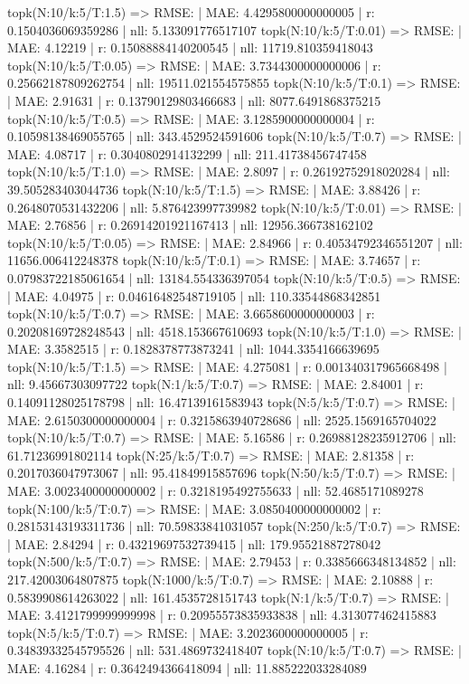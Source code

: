 topk(N:10/k:5/T:1.5) => RMSE: | MAE: 4.4295800000000005 | r: 0.1504036069359286 | nll: 5.133091776517107
topk(N:10/k:5/T:0.01) => RMSE: | MAE: 4.12219 | r: 0.15088884140200545 | nll: 11719.810359418043
topk(N:10/k:5/T:0.05) => RMSE: | MAE: 3.7344300000000006 | r: 0.25662187809262754 | nll: 19511.021554575855
topk(N:10/k:5/T:0.1) => RMSE: | MAE: 2.91631 | r: 0.13790129803466683 | nll: 8077.6491868375215
topk(N:10/k:5/T:0.5) => RMSE: | MAE: 3.1285900000000004 | r: 0.10598138469055765 | nll: 343.4529524591606
topk(N:10/k:5/T:0.7) => RMSE: | MAE: 4.08717 | r: 0.3040802914132299 | nll: 211.41738456747458
topk(N:10/k:5/T:1.0) => RMSE: | MAE: 2.8097 | r: 0.26192752918020284 | nll: 39.505283403044736
topk(N:10/k:5/T:1.5) => RMSE: | MAE: 3.88426 | r: 0.2648070531432206 | nll: 5.876423997739982
topk(N:10/k:5/T:0.01) => RMSE: | MAE: 2.76856 | r: 0.26914201921167413 | nll: 12956.366738162102
topk(N:10/k:5/T:0.05) => RMSE: | MAE: 2.84966 | r: 0.40534792346551207 | nll: 11656.006412248378
topk(N:10/k:5/T:0.1) => RMSE: | MAE: 3.74657 | r: 0.07983722185061654 | nll: 13184.554336397054
topk(N:10/k:5/T:0.5) => RMSE: | MAE: 4.04975 | r: 0.04616482548719105 | nll: 110.33544868342851
topk(N:10/k:5/T:0.7) => RMSE: | MAE: 3.6658600000000003 | r: 0.20208169728248543 | nll: 4518.153667610693
topk(N:10/k:5/T:1.0) => RMSE: | MAE: 3.3582515 | r: 0.1828378773873241 | nll: 1044.3354166639695
topk(N:10/k:5/T:1.5) => RMSE: | MAE: 4.275081 | r: 0.001340317965668498 | nll: 9.45667303097722
topk(N:1/k:5/T:0.7) => RMSE: | MAE: 2.84001 | r: 0.14091128025178798 | nll: 16.47139161583943
topk(N:5/k:5/T:0.7) => RMSE: | MAE: 2.6150300000000004 | r: 0.3215863940728686 | nll: 2525.1569165704022
topk(N:10/k:5/T:0.7) => RMSE: | MAE: 5.16586 | r: 0.26988128235912706 | nll: 61.71236991802114
topk(N:25/k:5/T:0.7) => RMSE: | MAE: 2.81358 | r: 0.2017036047973067 | nll: 95.41849915857696
topk(N:50/k:5/T:0.7) => RMSE: | MAE: 3.0023400000000002 | r: 0.3218195492755633 | nll: 52.4685171089278
topk(N:100/k:5/T:0.7) => RMSE: | MAE: 3.0850400000000002 | r: 0.28153143193311736 | nll: 70.59833841031057
topk(N:250/k:5/T:0.7) => RMSE: | MAE: 2.84294 | r: 0.43219697532739415 | nll: 179.95521887278042
topk(N:500/k:5/T:0.7) => RMSE: | MAE: 2.79453 | r: 0.3385666348134852 | nll: 217.42003064807875
topk(N:1000/k:5/T:0.7) => RMSE: | MAE: 2.10888 | r: 0.5839908614263022 | nll: 161.4535728151743
topk(N:1/k:5/T:0.7) => RMSE: | MAE: 3.4121799999999998 | r: 0.20955573835933838 | nll: 4.313077462415883
topk(N:5/k:5/T:0.7) => RMSE: | MAE: 3.2023600000000005 | r: 0.34839332545795526 | nll: 531.4869732418407
topk(N:10/k:5/T:0.7) => RMSE: | MAE: 4.16284 | r: 0.3642494366418094 | nll: 11.885222033284089
